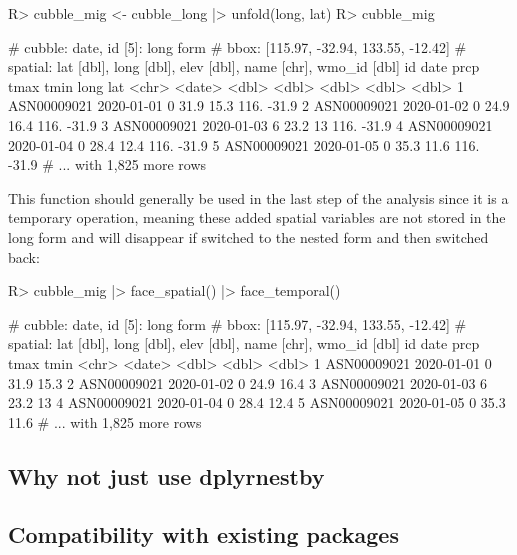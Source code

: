 \documentclass[
]{jss}
\begin{document}
\begin{CodeChunk}
\begin{CodeInput}
R> cubble_mig <- cubble_long |> unfold(long, lat)
R> cubble_mig
\end{CodeInput}
\begin{CodeOutput}
# cubble:  date, id [5]: long form
# bbox:    [115.97, -32.94, 133.55, -12.42]
# spatial: lat [dbl], long [dbl], elev [dbl], name [chr], wmo_id [dbl]
  id          date        prcp  tmax  tmin  long   lat
  <chr>       <date>     <dbl> <dbl> <dbl> <dbl> <dbl>
1 ASN00009021 2020-01-01     0  31.9  15.3  116. -31.9
2 ASN00009021 2020-01-02     0  24.9  16.4  116. -31.9
3 ASN00009021 2020-01-03     6  23.2  13    116. -31.9
4 ASN00009021 2020-01-04     0  28.4  12.4  116. -31.9
5 ASN00009021 2020-01-05     0  35.3  11.6  116. -31.9
# ... with 1,825 more rows
\end{CodeOutput}
\end{CodeChunk}

This function should generally be used in the last step of the analysis since it is a temporary operation, meaning these added spatial variables are not stored in the long form and will disappear if switched to the nested form and then switched back:

\begin{CodeChunk}
\begin{CodeInput}
R> cubble_mig |> face_spatial() |> face_temporal()
\end{CodeInput}
\begin{CodeOutput}
# cubble:  date, id [5]: long form
# bbox:    [115.97, -32.94, 133.55, -12.42]
# spatial: lat [dbl], long [dbl], elev [dbl], name [chr], wmo_id [dbl]
  id          date        prcp  tmax  tmin
  <chr>       <date>     <dbl> <dbl> <dbl>
1 ASN00009021 2020-01-01     0  31.9  15.3
2 ASN00009021 2020-01-02     0  24.9  16.4
3 ASN00009021 2020-01-03     6  23.2  13  
4 ASN00009021 2020-01-04     0  28.4  12.4
5 ASN00009021 2020-01-05     0  35.3  11.6
# ... with 1,825 more rows
\end{CodeOutput}
\end{CodeChunk}

\hypertarget{why-not-just-use-dplyrnestby}{%
\subsection{Why not just use dplyrnestby}\label{why-not-just-use-dplyrnestby}}

\hypertarget{compatibility-with-existing-packages}{%
\subsection{Compatibility with existing packages}\label{compatibility-with-existing-packages}}
\end{document}
